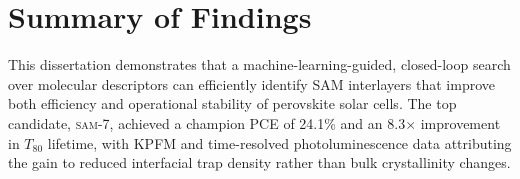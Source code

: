 \section{Summary of Findings}

This dissertation demonstrates that a machine-learning-guided,
closed-loop search over molecular descriptors can efficiently identify
SAM interlayers that improve both efficiency and operational stability of
perovskite solar cells. The top candidate, \textsc{sam-7}, achieved a
champion PCE of 24.1\% and an 8.3$\times$ improvement in $T_{80}$
lifetime, with KPFM and time-resolved photoluminescence data attributing
the gain to reduced interfacial trap density rather than bulk
crystallinity changes.
